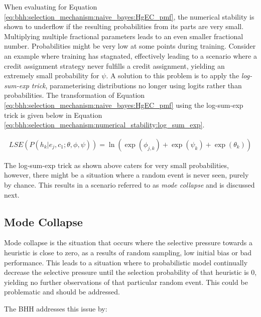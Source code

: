 When evaluating for Equation \ref{eq:bhh:selection_mechanism:naive_bayes:HgEC_pmf}, the numerical stability is shown to underflow if the resulting probabilities from its parts are very small. Multiplying multiple fractional parameters leads to an even smaller fractional number. Probabilities might be very low at some points during training. Consider an example where training has stagnated, effectively leading to a scenario where a credit assignment strategy never fulfills a credit assignment, yielding an extremely small probability for $\psi$. A solution to this problem is to apply the \textit{log-sum-exp trick}, parameterising distributions no longer using logits rather than probabilities. The transformation of Equation \ref{eq:bhh:selection_mechanism:naive_bayes:HgEC_pmf} using the log-sum-exp trick is given below in Equation \ref{eq:bhh:selection_mechanism:numerical_stability:log_sum_exp}.

\begin{equation}
      \label{eq:bhh:selection_mechanism:numerical_stability:log_sum_exp}
      \begin{split}
            LSE(P(h_{k} \vert e_{j}, c_{1};  \theta, \phi, \psi)) = \ln(\exp(\phi_{j,k}) +  \exp(\psi_{k}) + \exp(\theta_{k}))
      \end{split}
\end{equation}

The log-sum-exp trick as shown above caters for very small probabilities, however, there might be a situation where  a random event is never seen, purely by chance. This results in a scenario referred to as \textit{mode collapse} and is discussed next.

\subsection{Mode Collapse}
\label{sec:bhh:selection_mechanism:mode_collapse}

Mode collapse is the situation that occurs where the selective pressure towards a heuristic is close to zero, as a results of random sampling, low initial bias or bad performance. This leads to a situation where to probabilistic model continually decrease the selective pressure until the selection probability of that heuristic is 0, yielding no further observations of that particular random event. This could be problematic and should be addressed.

The \ac{BHH} addresses this issue by:


